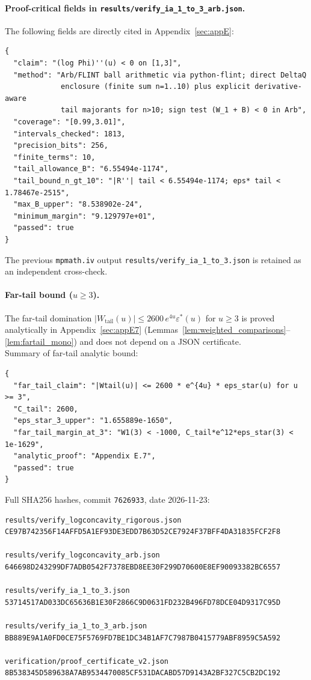 \documentclass[11pt]{article}
\theoremstyle{definition}
\theoremstyle{remark}
\begin{document}
\paragraph{Proof-critical fields in \texttt{results/verify\_ia\_1\_to\_3\_arb.json}.}
The following fields are directly cited in Appendix~\ref{sec:appE}:
\begin{center}\small
\begin{verbatim}
{
  "claim": "(log Phi)''(u) < 0 on [1,3]",
  "method": "Arb/FLINT ball arithmetic via python-flint; direct DeltaQ
             enclosure (finite sum n=1..10) plus explicit derivative-aware
             tail majorants for n>10; sign test (W_1 + B) < 0 in Arb",
  "coverage": "[0.99,3.01]",
  "intervals_checked": 1813,
  "precision_bits": 256,
  "finite_terms": 10,
  "tail_allowance_B": "6.55494e-1174",
  "tail_bound_n_gt_10": "|R''| tail < 6.55494e-1174; eps* tail < 1.78467e-2515",
  "max_B_upper": "8.538902e-24",
  "minimum_margin": "9.129797e+01",
  "passed": true
}
\end{verbatim}
\end{center}
\noindent The previous \texttt{mpmath.iv} output \texttt{results/verify\_ia\_1\_to\_3.json}
is retained as an independent cross-check.

\paragraph{Far-tail bound ($u\geq3$).}
The far-tail domination $|W_{\mathrm{tail}}(u)|\leq2600\,e^{4u}\varepsilon^*(u)$ for $u\geq3$
is proved analytically in Appendix~\ref{sec:appE7} (Lemmas~\ref{lem:weighted_comparisons}--\ref{lem:fartail_mono})
and does not depend on a JSON certificate.\\[2pt]
Summary of far-tail analytic bound:
\begin{center}\small
\begin{verbatim}
{
  "far_tail_claim": "|Wtail(u)| <= 2600 * e^{4u} * eps_star(u) for u >= 3",
  "C_tail": 2600,
  "eps_star_3_upper": "1.655889e-1650",
  "far_tail_margin_at_3": "W1(3) < -1000, C_tail*e^12*eps_star(3) < 1e-1629",
  "analytic_proof": "Appendix E.7",
  "passed": true
}
\end{verbatim}
\end{center}

\medskip\noindent
Full SHA256 hashes, commit \texttt{7626933}, date 2026-11-23:

\begin{verbatim}
results/verify_logconcavity_rigorous.json
CE97B742356F14AFFD5A1EF93DE3EDD7B63D52CE7924F37BFF4DA31835FCF2F8

results/verify_logconcavity_arb.json
646698D243299DF7ADB0542F7378EBD8EE30F299D70600E8EF90093382BC6557

results/verify_ia_1_to_3.json
53714517AD033DC65636B1E30F2866C9D0631FD232B496FD78DCE04D9317C95D

results/verify_ia_1_to_3_arb.json
BB889E9A1A0FD0CE75F5769FD7BE1DC34B1AF7C7987B0415779ABF8959C5A592

verification/proof_certificate_v2.json
8B538345D589638A7AB9534470085CF531DACABD57D9143A2BF327C5CB2DC192
\end{verbatim}
\end{document}
